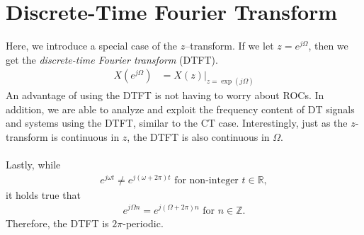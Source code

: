 \documentclass{report}
\begin{document}
\setcounter{chapter}{5}
\setcounter{page}{54}
\chapter{Discrete-Time Fourier Transform}

Here, we introduce a special case of the $z$--transform. If we let $z=e^{j\Omega}$, then we get the \emph{discrete-time Fourier transform} (DTFT).
\begin{align}
    X(e^{j\Omega}) &= X(z)\big|_{z=\exp(j\Omega)}
\end{align}
An advantage of using the DTFT is not having to worry about ROCs. In addition, we are able to analyze and exploit the frequency content of DT signals and systems 
using the DTFT, similar to the CT case. Interestingly, just as the $z$-transform is continuous in $z$, the DTFT is also continuous in $\Omega$.
\\ \\
Lastly, while 
\begin{align}
    e^{j\omega t} \neq e^{j(\omega+2\pi)t} \text{ for non-integer } t\in\mathbb{R},
\end{align}
it holds true that 
\begin{align}
    e^{j\Omega n} = e^{j(\Omega+2\pi)n} \text{ for } n\in\mathbb{Z}.
\end{align}
Therefore, the DTFT is $2\pi$-periodic.
\end{document}
